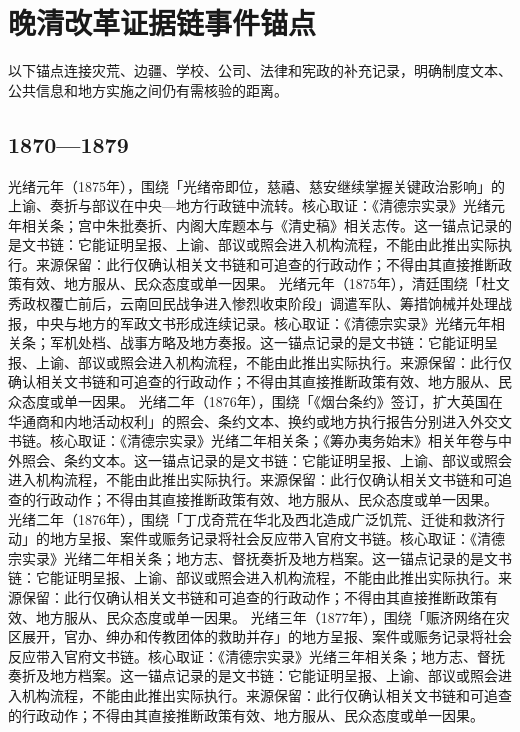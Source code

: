 \section{晚清改革证据链事件锚点}
以下锚点连接灾荒、边疆、学校、公司、法律和宪政的补充记录，明确制度文本、公共信息和地方实施之间仍有需核验的距离。
\subsection{1870—1879}
光绪元年（1875年），围绕「光绪帝即位，慈禧、慈安继续掌握关键政治影响」的上谕、奏折与部议在中央—地方行政链中流转。核心取证：《清德宗实录》光绪元年相关条；宫中朱批奏折、内阁大库题本与《清史稿》相关志传。这一锚点记录的是文书链：它能证明呈报、上谕、部议或照会进入机构流程，不能由此推出实际执行。来源保留：此行仅确认相关文书链和可追查的行政动作；不得由其直接推断政策有效、地方服从、民众态度或单一因果。
光绪元年（1875年），清廷围绕「杜文秀政权覆亡前后，云南回民战争进入惨烈收束阶段」调遣军队、筹措饷械并处理战报，中央与地方的军政文书形成连续记录。核心取证：《清德宗实录》光绪元年相关条；军机处档、战事方略及地方奏报。这一锚点记录的是文书链：它能证明呈报、上谕、部议或照会进入机构流程，不能由此推出实际执行。来源保留：此行仅确认相关文书链和可追查的行政动作；不得由其直接推断政策有效、地方服从、民众态度或单一因果。
光绪二年（1876年），围绕「《烟台条约》签订，扩大英国在华通商和内地活动权利」的照会、条约文本、换约或地方执行报告分别进入外交文书链。核心取证：《清德宗实录》光绪二年相关条；《筹办夷务始末》相关年卷与中外照会、条约文本。这一锚点记录的是文书链：它能证明呈报、上谕、部议或照会进入机构流程，不能由此推出实际执行。来源保留：此行仅确认相关文书链和可追查的行政动作；不得由其直接推断政策有效、地方服从、民众态度或单一因果。
光绪二年（1876年），围绕「丁戊奇荒在华北及西北造成广泛饥荒、迁徙和救济行动」的地方呈报、案件或赈务记录将社会反应带入官府文书链。核心取证：《清德宗实录》光绪二年相关条；地方志、督抚奏折及地方档案。这一锚点记录的是文书链：它能证明呈报、上谕、部议或照会进入机构流程，不能由此推出实际执行。来源保留：此行仅确认相关文书链和可追查的行政动作；不得由其直接推断政策有效、地方服从、民众态度或单一因果。
光绪三年（1877年），围绕「赈济网络在灾区展开，官办、绅办和传教团体的救助并存」的地方呈报、案件或赈务记录将社会反应带入官府文书链。核心取证：《清德宗实录》光绪三年相关条；地方志、督抚奏折及地方档案。这一锚点记录的是文书链：它能证明呈报、上谕、部议或照会进入机构流程，不能由此推出实际执行。来源保留：此行仅确认相关文书链和可追查的行政动作；不得由其直接推断政策有效、地方服从、民众态度或单一因果。
